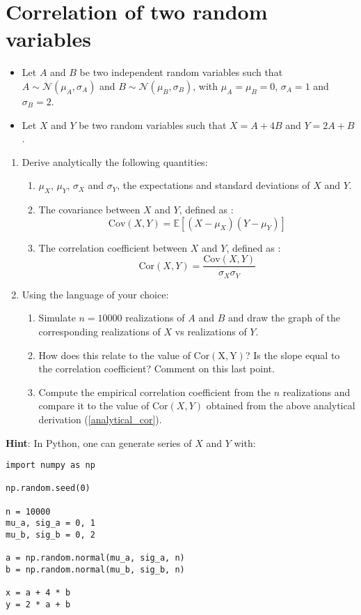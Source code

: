 \section{Correlation of two random variables}

\begin{itemize}
    \item Let $A$ and $B$ be two independent random variables such that $A \sim \mathcal{N}(\mu_A, \sigma_A)$ and $B \sim \mathcal{N}(\mu_B, \sigma_B)$, with $\mu_A = \mu_B = 0$, $\sigma_A = 1$ and $\sigma_B = 2$.
    \item Let $X$ and $Y$ be two random variables such that $X = A + 4B$ and $Y = 2A + B$.
\end{itemize}

\begin{enumerate}
    \item Derive analytically the following quantities:
    \begin{enumerate}
        \item $\mu_X$, $\mu_Y$, $\sigma_X$ and $\sigma_Y$, the expectations and standard deviations of $X$ and $Y$. 
        \item The covariance between $X$ and $Y$, defined as : $$\mathrm{Cov}(X, Y) = \mathbb{E}[(X - \mu_X)(Y - \mu_Y)]$$
        \item\label{analytical_cor} The correlation coefficient between $X$ and $Y$, defined as : $$\mathrm{Cor}(X, Y) = \frac{\mathrm{Cov}(X, Y)}{\sigma_X \sigma_Y}$$
    \end{enumerate}
    \item Using the language of your choice: 
    \begin{enumerate}
        \item Simulate $n = 10000$ realizations of $A$ and $B$ and draw the graph of the corresponding realizations of $X$ vs realizations of $Y$.
        \item How does this relate to the value of $\mathrm{Cor(X, Y)}$? Is the slope equal to the correlation coefficient? Comment on this last point.
        \item Compute the empirical correlation coefficient from the $n$ realizations and compare it to the value of $\mathrm{Cor}(X, Y)$ obtained from the above analytical derivation (\ref{analytical_cor}). 
    \end{enumerate}
\end{enumerate}

\noindent \textbf{Hint}: In Python, one can generate series of $X$ and $Y$ with:

\begin{verbatim}
import numpy as np

np.random.seed(0)

n = 10000
mu_a, sig_a = 0, 1
mu_b, sig_b = 0, 2

a = np.random.normal(mu_a, sig_a, n)
b = np.random.normal(mu_b, sig_b, n)

x = a + 4 * b
y = 2 * a + b
\end{verbatim}


